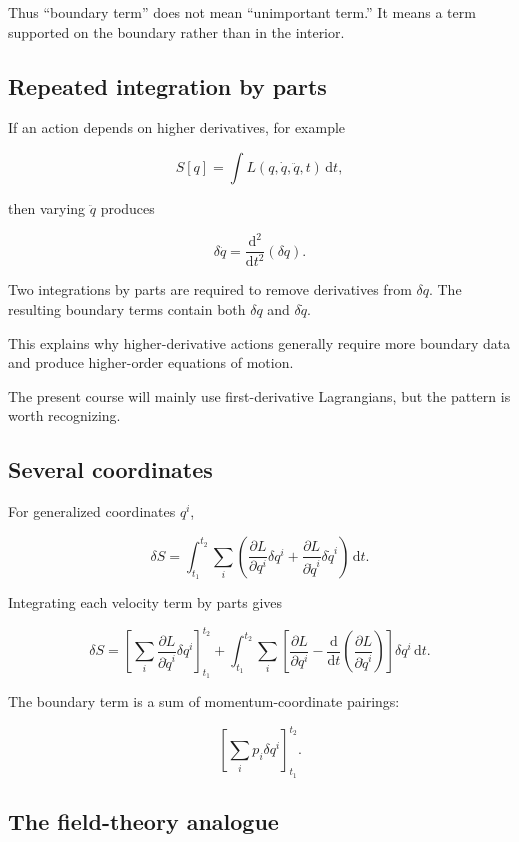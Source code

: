 Thus ``boundary term'' does not mean ``unimportant term.'' It means a term supported on the boundary rather than in the interior.

\subsection{Repeated integration by parts}

If an action depends on higher derivatives, for example

\[
S[q]
=
\int
L(q,\dot q,\ddot q,t)
\,\mathrm{d}t,
\]

then varying \(\ddot q\) produces

\[
\delta\ddot q
=
\frac{\mathrm{d}^{2}}{\mathrm{d}t^{2}}(\delta q).
\]

Two integrations by parts are required to remove derivatives from \(\delta q\). The resulting boundary terms contain both \(\delta q\) and \(\delta\dot q\).

This explains why higher-derivative actions generally require more boundary data and produce higher-order equations of motion.

The present course will mainly use first-derivative Lagrangians, but the pattern is worth recognizing.

\subsection{Several coordinates}

For generalized coordinates \(q^{i}\),

\[
\delta S
=
\int_{t_{1}}^{t_{2}}
\sum_{i}
\left(
\frac{\partial L}{\partial q^{i}}\delta q^{i}
+
\frac{\partial L}{\partial\dot q^{i}}\delta\dot q^{i}
\right)
\,\mathrm{d}t.
\]

Integrating each velocity term by parts gives

\[
\delta S
=
\left[
\sum_{i}
\frac{\partial L}{\partial\dot q^{i}}
\delta q^{i}
\right]_{t_{1}}^{t_{2}}
+
\int_{t_{1}}^{t_{2}}
\sum_{i}
\left[
\frac{\partial L}{\partial q^{i}}
-
\frac{\mathrm{d}}{\mathrm{d}t}
\left(
\frac{\partial L}{\partial\dot q^{i}}
\right)
\right]
\delta q^{i}
\,\mathrm{d}t.
\]

The boundary term is a sum of momentum-coordinate pairings:

\[
\left[
\sum_{i}p_{i}\delta q^{i}
\right]_{t_{1}}^{t_{2}}.
\]

\subsection{The field-theory analogue}

